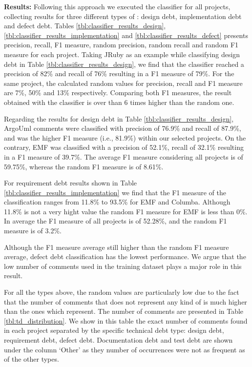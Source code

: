 \vspace{1mm}
\noindent \textbf{Results:} Following this approach we executed the classifier for all projects, collecting results for three different types of \SATD: design debt, implementation debt and defect debt. Tables \ref{tbl:classifier_results_design}, \ref{tbl:classifier_results_implementation} and \ref{tbl:classifier_results_defect} presents precision, recall, F1 measure, random precision, random recall and random F1 measure for each project. Taking JRuby as an example while classifying design debt in Table \ref{tbl:classifier_results_design}, we find that the classifier reached a precision of 82\% and recall of 76\% resulting in a F1 measure of 79\%. For the same project, the calculated random values for precision, recall and F1 measure are 7\%, 50\% and 13\% respectively. Comparing both F1 measures, the result obtained with the classifier is over than 6 times higher than the random one.

Regarding the results for design debt in Table \ref{tbl:classifier_results_design}, ArgoUml \SATD comments were classified with precision of 76.9\% and recall of 87.9\%, and was the higher F1 measure (i.e., 81.9\%) within our selected projects. On the contrary, EMF was classified with a precision of 52.1\%, recall of 32.1\% resulting in a F1 measure of 39.7\%. The average F1 measure considering  all projects is of 59.75\%, whereas the random F1 measure is of 8.61\%. 

For requirement debt results shown in Table \ref{tbl:classifier_results_implementation} we find that the F1 measure of the classification ranges from 11.8\% to 93.5\% for EMF and Columba. Although 11.8\% is not a very hight value the random F1 measure for EMF is less than 0\%. In average the F1 measure of all projects is of 52.28\%, and the random F1 measure is of 3.2\%. 

Although the F1 measure average still higher than the random F1 measure average, defect debt classification has the lowest performance. We argue that the low number of \SATD comments used in the training dataset plays a major role in this result. 

For all the types above, the random values are particularly low due to the fact that the number of comments that does not represent any kind of \SATD is much higher than the ones which represent. The number of \SATD comments are presented in Table \ref{tbl:td_distribution}. We show in this table the exact number of \SATD comments found in each project separated by the specific technical debt type: design debt, requirement debt, defect debt. Documentation debt and test debt are shown under the column `Other' as they number of occurrences were not as frequent as of the other types. 

